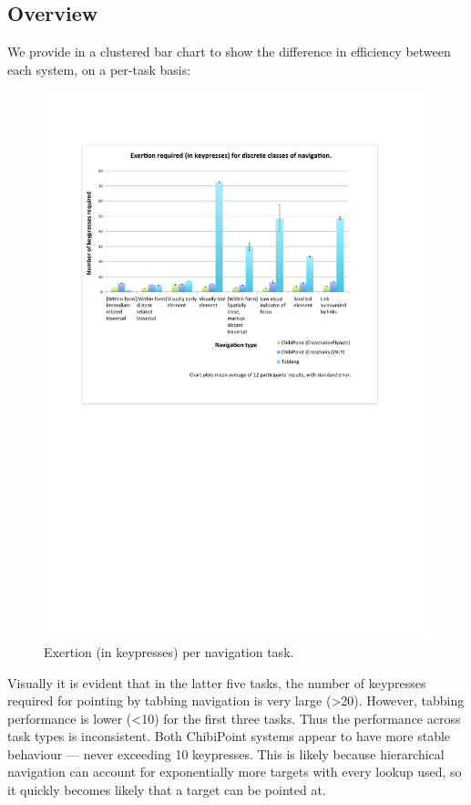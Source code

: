 \documentclass[a4paper, 12pt]{report}
\begin{document}
\subsection{Overview}
We provide in  a clustered bar chart to show the difference in efficiency between each system, on a per-task basis:
\begin{figure}[ht]
\centerline{\includegraphics[width=8in]{figures/Exertion2.pdf}}
\caption{Exertion (in keypresses) per navigation task.}
\label{fig:exertion}
\end{figure}
\FloatBarrier
Visually it is evident that in the latter five tasks, the number of keypresses required for pointing by tabbing navigation is very large (>20). However, tabbing performance is lower (<10) for the first three tasks. Thus the performance across task types is inconsistent. Both ChibiPoint systems appear to have more stable behaviour --- never exceeding 10 keypresses. This is likely because hierarchical navigation can account for exponentially more targets with every lookup used, so it quickly becomes likely that a target can be pointed at.
\end{document}

